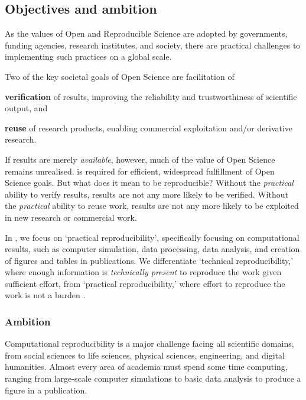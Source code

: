 \subsection{Objectives and ambition}

\label{sect:objectives}

As the values of Open and Reproducible Science are adopted by
governments, funding agencies, research institutes, and society,
there are practical challenges to implementing such practices on a global scale.

Two of the key societal goals of Open Science are facilitation of

\begin{compactenum}
\item \textbf{verification} of results, improving the reliability and trustworthiness of scientific output, and
\item \textbf{reuse} of research products, enabling commercial exploitation and/or derivative research.
\end{compactenum}

If results are merely \emph{available}, however,
much of the value of Open Science remains unrealised.
 is required for efficient, widespread fulfillment of Open Science goals.
But what does it mean to be reproducible?
Without the \emph{practical} ability to verify results, results are not
any more likely to be verified.
Without the \emph{practical} ability to reuse work, results are not
any more likely to be exploited in new research or commercial work.

In \TheProject, we focus on `practical reproducibility',
specifically focusing on computational results, such as computer simulation, data
processing, data analysis, and creation of figures and tables in publications.
We differentiate `technical reproducibility,'
where enough information is \emph{technically present} to reproduce the work given sufficient effort,
from `practical reproducibility,'
where effort to reproduce the work is not a burden \cite{binder}.

\subsubsection{Ambition}

Computational reproducibility is a major challenge facing all scientific domains,
from social sciences to life sciences, physical sciences, engineering, and digital humanities.
Almost every area of academia must spend some time computing,
ranging from large-scale computer simulations to basic data analysis to produce a figure in a publication.

